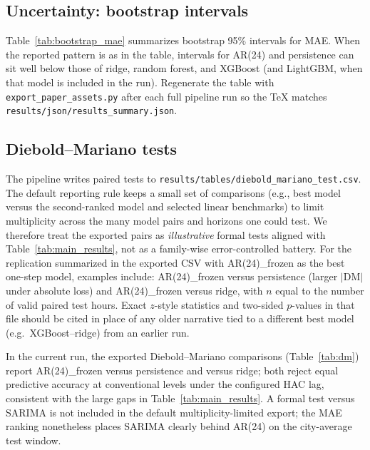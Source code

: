 \documentclass[11pt,a4paper]{article}
\begin{document}


\subsection{Uncertainty: bootstrap intervals}

Table~\ref{tab:bootstrap_mae} summarizes bootstrap 95\% intervals for MAE. When the reported pattern is as in the table, intervals for AR(24) and persistence can sit well below those of ridge, random forest, and XGBoost (and LightGBM, when that model is included in the run). Regenerate the table with \texttt{export\_paper\_assets.py} after each full pipeline run so the TeX matches \texttt{results/json/results\_summary.json}.



\subsection{Diebold--Mariano tests}

The pipeline writes paired tests to \texttt{results/tables/diebold\_mariano\_test.csv}. The default reporting rule keeps a small set of comparisons (e.g., best model versus the second-ranked model and selected linear benchmarks) to limit multiplicity across the many model pairs and horizons one could test. We therefore treat the exported pairs as \emph{illustrative} formal tests aligned with Table~\ref{tab:main_results}, not as a family-wise error-controlled battery. For the replication summarized in the exported CSV with AR(24)\_frozen as the best one-step model, examples include: AR(24)\_frozen versus persistence (larger $|\mathrm{DM}|$ under absolute loss) and AR(24)\_frozen versus ridge, with $n$ equal to the number of valid paired test hours. Exact $z$-style statistics and two-sided $p$-values in that file should be cited in place of any older narrative tied to a different best model (e.g.\ XGBoost--ridge) from an earlier run.

In the current run, the exported Diebold--Mariano comparisons (Table~\ref{tab:dm}) report AR(24)\_frozen versus persistence and versus ridge; both reject equal predictive accuracy at conventional levels under the configured HAC lag, consistent with the large gaps in Table~\ref{tab:main_results}. A formal test versus SARIMA is not included in the default multiplicity-limited export; the MAE ranking nonetheless places SARIMA clearly behind AR(24) on the city-average test window.
\end{document}
